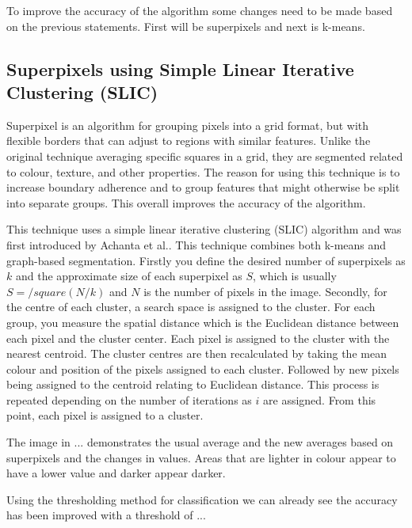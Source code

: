 To improve the accuracy of the algorithm some changes need to be made based on the previous statements. First will be superpixels and next is k-means.

\subsection{Superpixels using Simple Linear Iterative Clustering (SLIC)}
Superpixel is an algorithm for grouping pixels into a grid format, but with flexible borders that can adjust to regions with similar features. Unlike the original technique averaging specific squares in a grid\cite{Kasmi2016}, they are segmented related to colour, texture, and other properties. The reason for using this technique is to increase boundary adherence and to group features that might otherwise be split into separate groups. This overall improves the accuracy of the algorithm.

This technique uses a simple linear iterative clustering (SLIC) algorithm and was first introduced by Achanta et al.\cite{Achanta2012}. This technique combines both k-means and graph-based segmentation. Firstly you define the desired number of superpixels as $k$ and the approximate size of each superpixel as $S$, which is usually $S = /square(N/k)$ and $N$ is the number of pixels in the image. Secondly, for the centre of each cluster, a search space is assigned to the cluster. For each group, you measure the spatial distance which is the Euclidean distance between each pixel and the cluster center. Each pixel is assigned to the cluster with the nearest centroid. The cluster centres are then recalculated by taking the mean colour and position of the pixels assigned to each cluster. Followed by new pixels being assigned to the centroid relating to Euclidean distance. This process is repeated depending on the number of iterations as $i$ are assigned. From this point, each pixel is assigned to a cluster.

The image in ... demonstrates the usual average and the new averages based on superpixels and the changes in values. Areas that are lighter in colour appear to have a lower value and darker appear darker.

Using the thresholding method for classification we can already see the accuracy has been improved with a threshold of ...

